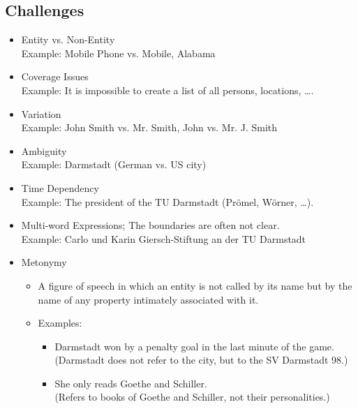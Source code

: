 \documentclass[a4paper, 11pt, accentcolor = tud3b]{tudreport}
\begin{document}
            \subsection{Challenges} %
                \begin{itemize}
                	\item Entity vs. Non-Entity \\ Example: Mobile Phone vs. Mobile, Alabama
                	\item Coverage Issues \\ Example: It is impossible to create a list of all persons, locations, \dots.
                	\item Variation \\ Example: John Smith vs. Mr. Smith, John vs. Mr. J. Smith
                	\item Ambiguity \\ Example: Darmstadt (German vs. US city)
                	\item Time Dependency \\ Example: The president of the TU Darmstadt (Prömel, Wörner, \dots).
                	\item Multi-word Expressions; The boundaries are often not clear. \\ Example: Carlo und Karin Giersch-Stiftung an der TU Darmstadt
                	\item Metonymy
                		\begin{itemize}
                			\item A figure of speech in which an entity is not called by its name but by the name of any property intimately associated with it.
                			\item Examples:
                			\begin{itemize}
                				\item Darmstadt won by a penalty goal in the last minute of the game. \\ (Darmstadt does not refer to the city, but to the SV Darmstadt 98.)
                				\item She only reads Goethe and Schiller. \\ (Refers to books of Goethe and Schiller, not their personalities.)
                			\end{itemize}
                		\end{itemize}
                \end{itemize}
\end{document}
